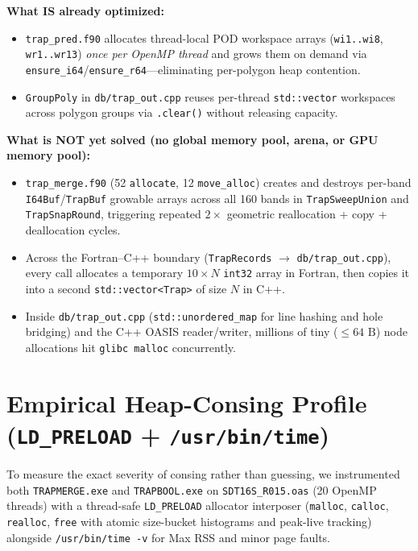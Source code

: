 \textbf{What IS already optimized:}
\begin{itemize}
  \item \texttt{trap\_pred.f90} allocates thread-local POD workspace arrays (\texttt{wi1..wi8}, \texttt{wr1..wr13}) \emph{once per OpenMP thread} and grows them on demand via \texttt{ensure\_i64}/\texttt{ensure\_r64}---eliminating per-polygon heap contention.
  \item \texttt{GroupPoly} in \texttt{db/trap\_out.cpp} reuses per-thread \texttt{std::vector} workspaces across polygon groups via \texttt{.clear()} without releasing capacity.
\end{itemize}

\textbf{What is NOT yet solved (no global memory pool, arena, or GPU memory pool):}
\begin{itemize}
  \item \texttt{trap\_merge.f90} (52 \texttt{allocate}, 12 \texttt{move\_alloc}) creates and destroys per-band \texttt{I64Buf}/\texttt{TrapBuf} growable arrays across all 160 bands in \texttt{TrapSweepUnion} and \texttt{TrapSnapRound}, triggering repeated $2\times$ geometric reallocation + copy + deallocation cycles.
  \item Across the Fortran--C++ boundary (\texttt{TrapRecords} $\to$ \texttt{db/trap\_out.cpp}), every call allocates a temporary $10 \times N$ \texttt{int32} array in Fortran, then copies it into a second \texttt{std::vector<Trap>} of size $N$ in C++.
  \item Inside \texttt{db/trap\_out.cpp} (\texttt{std::unordered\_map} for line hashing and hole bridging) and the C++ OASIS reader/writer, millions of tiny ($\le 64\text{ B}$) node allocations hit \texttt{glibc malloc} concurrently.
\end{itemize}

\section{Empirical Heap-Consing Profile (\texttt{LD\_PRELOAD} + \texttt{/usr/bin/time})}

To measure the exact severity of consing rather than guessing, we instrumented both \texttt{TRAPMERGE.exe} and \texttt{TRAPBOOL.exe} on \texttt{SDT16S\_R015.oas} (20 OpenMP threads) with a thread-safe \texttt{LD\_PRELOAD} allocator interposer (\texttt{malloc}, \texttt{calloc}, \texttt{realloc}, \texttt{free} with atomic size-bucket histograms and peak-live tracking) alongside \texttt{/usr/bin/time -v} for Max RSS and minor page faults.

